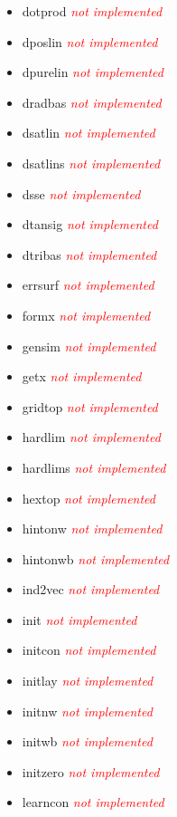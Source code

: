 \begin{itemize}
	\item dotprod \textcolor{red}{\textit{not implemented}}
	\item dposlin \textcolor{red}{\textit{not implemented}}
	\item dpurelin \textcolor{red}{\textit{not implemented}} 
	\item dradbas \textcolor{red}{\textit{not implemented}}
	\item dsatlin \textcolor{red}{\textit{not implemented}}
	\item dsatlins \textcolor{red}{\textit{not implemented}}
	\item dsse \textcolor{red}{\textit{not implemented}}
	\item dtansig \textcolor{red}{\textit{not implemented}} 
	\item dtribas \textcolor{red}{\textit{not implemented}}
	\item errsurf \textcolor{red}{\textit{not implemented}}
	\item formx \textcolor{red}{\textit{not implemented}}
	\item gensim \textcolor{red}{\textit{not implemented}}
	\item getx \textcolor{red}{\textit{not implemented}}
	\item gridtop \textcolor{red}{\textit{not implemented}}
	\item hardlim \textcolor{red}{\textit{not implemented}}
	\item hardlims \textcolor{red}{\textit{not implemented}}
	\item hextop \textcolor{red}{\textit{not implemented}} 
	\item hintonw \textcolor{red}{\textit{not implemented}}
	\item hintonwb \textcolor{red}{\textit{not implemented}}
	\item ind2vec \textcolor{red}{\textit{not implemented}}
	\item init \textcolor{red}{\textit{not implemented}} 
	\item initcon \textcolor{red}{\textit{not implemented}}
	\item initlay \textcolor{red}{\textit{not implemented}}
	\item initnw \textcolor{red}{\textit{not implemented}}
	\item initwb \textcolor{red}{\textit{not implemented}} 
	\item initzero \textcolor{red}{\textit{not implemented}}
	\item learncon \textcolor{red}{\textit{not implemented}}

\end{itemize}
